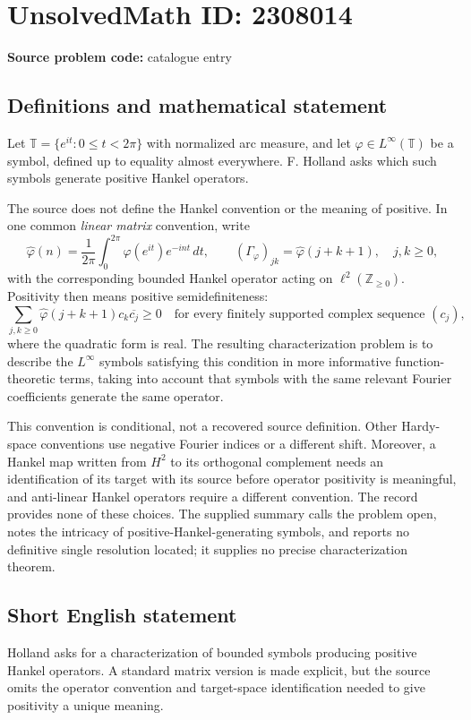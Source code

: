 \documentclass[11pt]{article}
\newcommand{\Z}{\mathbb{Z}}
\begin{document}
\section*{UnsolvedMath ID: 2308014}
\textbf{Source problem code:} catalogue entry
\subsection{Definitions and mathematical statement}
Let $\mathbb T=\{e^{it}:0\leq t<2\pi\}$ with normalized arc measure, and let $\varphi\in L^\infty(\mathbb T)$ be a symbol, defined up to equality almost everywhere. F. Holland asks which such symbols generate positive Hankel operators.

The source does not define the Hankel convention or the meaning of positive. In one common \emph{linear matrix} convention, write
\[
\widehat\varphi(n)=\frac1{2\pi}\int_0^{2\pi}\varphi(e^{it})e^{-int}\,dt,
\qquad
(\Gamma_\varphi)_{jk}=\widehat\varphi(j+k+1),\quad j,k\geq0,
\]
with the corresponding bounded Hankel operator acting on $\ell^2(\Z_{\geq0})$. Positivity then means positive semidefiniteness:
\[
\sum_{j,k\geq0}\widehat\varphi(j+k+1)c_k\overline{c_j}\geq0
\quad\text{for every finitely supported complex sequence }(c_j),
\]
where the quadratic form is real. The resulting characterization problem is to describe the $L^\infty$ symbols satisfying this condition in more informative function-theoretic terms, taking into account that symbols with the same relevant Fourier coefficients generate the same operator.

This convention is conditional, not a recovered source definition. Other Hardy-space conventions use negative Fourier indices or a different shift. Moreover, a Hankel map written from $H^2$ to its orthogonal complement needs an identification of its target with its source before operator positivity is meaningful, and anti-linear Hankel operators require a different convention. The record provides none of these choices. The supplied summary calls the problem open, notes the intricacy of positive-Hankel-generating symbols, and reports no definitive single resolution located; it supplies no precise characterization theorem.
\subsection{Short English statement}
Holland asks for a characterization of bounded symbols producing positive Hankel operators. A standard matrix version is made explicit, but the source omits the operator convention and target-space identification needed to give positivity a unique meaning.
\end{document}
